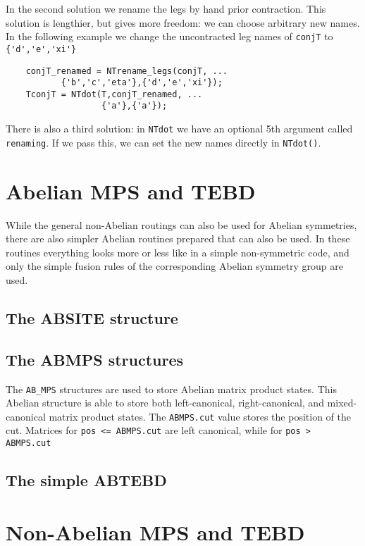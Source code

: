 \documentclass[aps,prb,twocolumn,showpacs,preprintnumbers,amsmath,amssymb, superscriptaddressm, nofootinbib]{revtex4-2}   %
\begin{document}
In the second solution we rename the legs by hand prior contraction. This solution is lengthier, but gives more freedom: we can choose arbitrary new names. In the following example we change the uncontracted leg names of \verb|conjT| to \verb|{'d','e','xi'}|
\begin{verbatim}
    conjT_renamed = NTrename_legs(conjT, ... 
           {'b','c','eta'},{'d','e','xi'});
    TconjT = NTdot(T,conjT_renamed, ... 
                   {'a'},{'a'});
\end{verbatim}

There is also a third solution: in \verb|NTdot| we have an optional 5th argument called \verb|renaming|. If we pass this, we can set the new names directly in \verb|NTdot()|.
\vspace{6pt}

\section{Abelian MPS and TEBD}
While the general non-Abelian routings can also be used for Abelian symmetries, there are also simpler Abelian routines prepared that can also be used. In these routines everything looks more or less like in a simple non-symmetric code, and only the simple fusion rules of the corresponding Abelian symmetry group are used.

\subsection{The ABSITE structure}

\subsection{The ABMPS structures}
The \verb|AB_MPS| structures are used to store Abelian matrix product states. This Abelian structure is able to store both left-canonical, right-canonical, and mixed-canonical matrix product states. The \verb|ABMPS.cut| value stores the position of the cut. Matrices for \verb|pos <= ABMPS.cut| are left canonical, while for \verb|pos > ABMPS.cut|   

\subsection{The simple ABTEBD}

\section{Non-Abelian MPS and TEBD}
\end{document}
